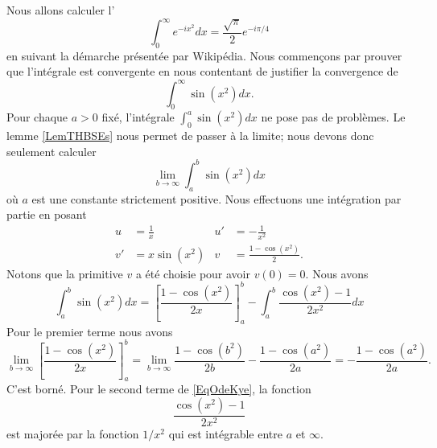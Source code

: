 Nous allons calculer l'
\begin{equation}
	\int_0^{\infty} e^{-ix^2}dx=\frac{ \sqrt{\pi} }{ 2 } e^{-i\pi/4}
\end{equation}
en suivant la démarche présentée par Wikipédia\cite{ooOXWGooGhLJvX}. Nous commençons par prouver que l'intégrale est convergente en nous contentant de justifier la convergence de
\begin{equation}
	\int_0^{\infty}\sin(x^2)dx.
\end{equation}
Pour chaque \( a>0\) fixé, l'intégrale \( \int_0^a\sin(x^2)dx\) ne pose pas de problèmes. Le lemme \ref{LemTHBSEs} nous permet de passer à la limite; nous devons donc seulement calculer
\begin{equation}
	\lim_{b\to \infty}\int_a^b\sin(x^2)dx
\end{equation}
où \( a\) est une constante strictement positive. Nous effectuons une intégration par partie en posant
\begin{subequations}
	\begin{align}
		u  & =\frac{1}{ x } & u' & =-\frac{1}{ x^2 }         \\
		v' & =x\sin(x^2)    & v  & =\frac{ 1-\cos(x^2) }{2}.
	\end{align}
\end{subequations}
Notons que la primitive \( v\) a été choisie pour avoir \( v(0)=0\). Nous avons
\begin{equation}    \label{EqOdeKye}
	\int_a^b\sin(x^2)dx=\left[ \frac{ 1-\cos(x^2) }{ 2x } \right]_a^b-\int_a^b\frac{ \cos(x^2)-1 }{ 2x^2 }dx
\end{equation}
Pour le premier terme nous avons
\begin{equation}
	\lim_{b\to \infty}\left[ \frac{ 1-\cos(x^2) }{ 2x } \right]_a^b=\lim_{b\to \infty}\frac{ 1-\cos(b^2) }{ 2b }-\frac{ 1-\cos(a^2) }{ 2a }=-\frac{ 1-\cos(a^2) }{ 2a }.
\end{equation}
C'est borné. Pour le second terme de \eqref{EqOdeKye}, la fonction
\begin{equation}
	\frac{ \cos(x^2)-1 }{ 2x^2 }
\end{equation}
est majorée par la fonction \( 1/x^2\) qui est intégrable entre \( a\) et \( \infty\).


